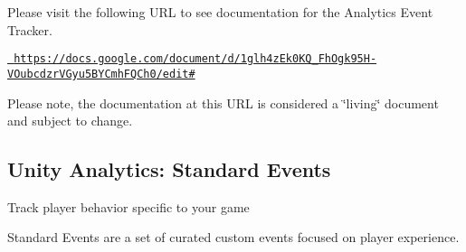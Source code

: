 Please visit the following U\+RL to see documentation for the Analytics Event Tracker.

\href{https://docs.google.com/document/d/1glh4zEk0KQ_FhOgk95H-VOubcdzrVGyu5BYCmhFQCh0/edit\#}{\texttt{ https\+://docs.\+google.\+com/document/d/1glh4z\+Ek0\+K\+Q\+\_\+\+Fh\+Ogk95\+H-\/\+V\+Oubcdzr\+V\+Gyu5\+B\+Y\+Cmh\+F\+Q\+Ch0/edit\#}}

Please note, the documentation at this U\+RL is considered a \char`\"{}living\char`\"{} document and subject to change.

\subsection*{Unity Analytics\+: Standard Events }

Track player behavior specific to your game

Standard Events are a set of curated custom events focused on player experience. 